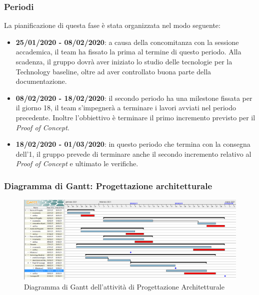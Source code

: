 \subsubsection{Periodi}
La pianificazione di questa fase è stata organizzata nel modo seguente:
\begin{itemize}
\item \textbf{25/01/2020 - 08/02/2020}: a causa della concomitanza con la sessione accademica, il team ha fissato la prima  al termine di questo periodo. Alla scadenza, il gruppo dovrà aver iniziato lo studio delle tecnologie per la Technology baseline, oltre ad aver controllato buona parte della documentazione.

\item \textbf{08/02/2020 - 18/02/2020}: il secondo periodo ha una milestone fissata per il giorno 18, il team s'impegnerà a terminare i lavori avviati nel periodo precedente. Inoltre l'obbiettivo è terminare il primo incremento previsto per il \textit{Proof of Concept}.

\item \textbf{18/02/2020 - 01/03/2020}: in questo periodo che termina con la consegna dell'1, il gruppo prevede di terminare anche il secondo incremento relativo al \textit{Proof of Concept} e ultimato le verifiche.
\end{itemize}

\subsubsection{Diagramma di Gantt: Progettazione architetturale}
\begin{figure}[h]
	\includegraphics[scale=0.40]{Images/GanttPianificazioneProgettazioneArchitetturale.PNG}
	\caption{Diagramma di Gantt dell'attività di Progettazione Architetturale}
\end{figure}